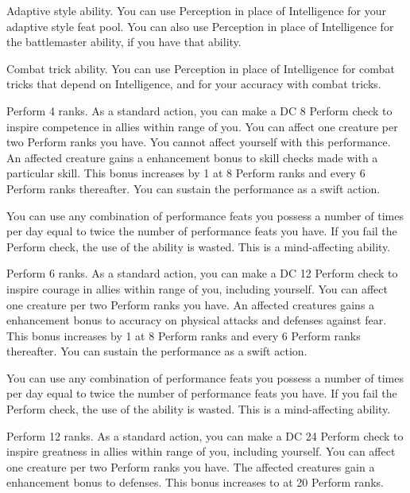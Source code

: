 \featpre Adaptive style ability.
\featben You can use Perception in place of Intelligence for your adaptive style feat pool.
You can also use Perception in place of Intelligence for the battlemaster ability, if you have that ability.

\featpre Combat trick ability.
\featben You can use Perception in place of Intelligence for combat tricks that depend on Intelligence, and for your accuracy with combat tricks.

\featpre Perform 4 ranks.
\featben As a standard action, you can make a DC 8 Perform check to inspire competence in allies within \rngmed range of you.
You can affect one creature per two Perform ranks you have.
You cannot affect yourself with this performance.
An affected creature gains a  enhancement bonus to skill checks made with a particular skill.
This bonus increases by 1 at 8 Perform ranks and every 6 Perform ranks thereafter.
You can sustain the performance as a swift action.

You can use any combination of performance feats you possess a number of times per day equal to twice the number of performance feats you have.
If you fail the Perform check, the use of the ability is wasted.
This is a mind-affecting ability.

\featpre Perform 6 ranks.
\featben As a standard action, you can make a DC 12 Perform check to inspire courage in allies within \rngmed range of you, including yourself.
You can affect one creature per two Perform ranks you have.
An affected creatures gains a  enhancement bonus to accuracy on physical attacks and defenses against fear.
This bonus increases by 1 at 8 Perform ranks and every 6 Perform ranks thereafter.
You can sustain the performance as a swift action.

You can use any combination of performance feats you possess a number of times per day equal to twice the number of performance feats you have.
If you fail the Perform check, the use of the ability is wasted.
This is a mind-affecting ability.

\featpre Perform 12 ranks.
\featben As a standard action, you can make a DC 24 Perform check to inspire greatness in allies within \rngmed range of you, including yourself.
You can affect one creature per two Perform ranks you have.
The affected creatures gain a  enhancement bonus to defenses.
This bonus increases to  at 20 Perform ranks.

